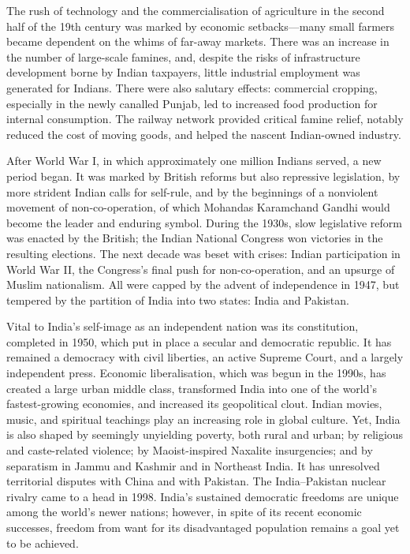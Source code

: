 The rush of technology and the commercialisation of agriculture in the
second half of the 19th century was marked by economic setbacks---many
small farmers became dependent on the whims of far-away markets. There
was an increase in the number of large-scale famines, and, despite the
risks of infrastructure development borne by Indian taxpayers, little
industrial employment was generated for Indians. There were also
salutary effects: commercial cropping, especially in the newly canalled
Punjab, led to increased food production for internal consumption. The
railway network provided critical famine relief, notably reduced the
cost of moving goods, and helped the nascent Indian-owned industry.

After World War I, in which approximately one million Indians served, a
new period began. It was marked by British reforms but also repressive
legislation, by more strident Indian calls for self-rule, and by the
beginnings of a nonviolent movement of non-co-operation, of which
Mohandas Karamchand Gandhi would become the leader and enduring symbol.
During the 1930s, slow legislative reform was enacted by the British;
the Indian National Congress won victories in the resulting elections.
The next decade was beset with crises: Indian participation in World War
II, the Congress's final push for non-co-operation, and an upsurge of
Muslim nationalism. All were capped by the advent of independence in
1947, but tempered by the partition of India into two states: India and
Pakistan.

Vital to India's self-image as an independent nation was its
constitution, completed in 1950, which put in place a secular and
democratic republic. It has remained a democracy with civil liberties,
an active Supreme Court, and a largely independent press. Economic
liberalisation, which was begun in the 1990s, has created a large urban
middle class, transformed India into one of the world's fastest-growing
economies, and increased its geopolitical clout. Indian movies, music,
and spiritual teachings play an increasing role in global culture. Yet,
India is also shaped by seemingly unyielding poverty, both rural and
urban; by religious and caste-related violence; by Maoist-inspired
Naxalite insurgencies; and by separatism in Jammu and Kashmir and in
Northeast India. It has unresolved territorial disputes with China and
with Pakistan. The India--Pakistan nuclear rivalry came to a head in
1998. India's sustained democratic freedoms are unique among the world's
newer nations; however, in spite of its recent economic successes,
freedom from want for its disadvantaged population remains a goal yet to
be achieved.

